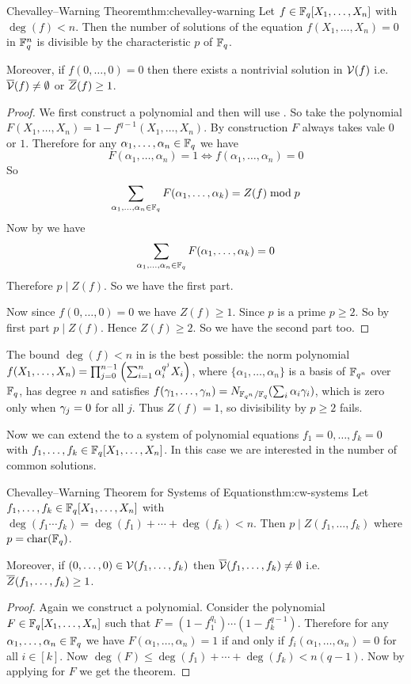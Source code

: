 \begin{Theorem}{Chevalley--Warning Theorem}{thm:chevalley-warning}
  Let $f\in\mathbb{F}_q[X_1,\dots,X_n]$ with $\deg(f)<n$. Then the number of solutions of the equation $f(X_1,\dots, X_n)=0$ in $\mathbb{F}_q^n$ is divisible by the characteristic $p$ of $\mathbb{F}_q$.

  Moreover, if $f(0,\dots, 0)=0$ then there exists a nontrivial solution in $\mathcal{V}(f)$ i.e. $\overline{\mathcal{V}}(f)\neq \emptyset$ or $\overline{Z}(f)\geq 1$.
\end{Theorem}
\begin{proof}
  We first construct a polynomial and then will use \PolyEvallem. So take the polynomial $F(X_1,\dots, X_n)=1-f^{q-1}(X_1,\dots, X_n)$. By construction $F$ always takes vale $0$ or $1$. Therefore for any $\alpha_1,\dots, \alpha_n\in\mathbb{F}_q$ we have $$F(\alpha_1,\dots,\alpha_n)=1\iff f(\alpha_1,\dots, \alpha_n)=0$$So $$\sum_{\alpha_1,\dots,\alpha_n\in\mathbb{F}_q}F(\alpha_1,\dots, \alpha_k)=Z(f)\bmod p$$Now by \PolyEvallem we have $$\sum_{\alpha_1,\dots,\alpha_n\in\mathbb{F}_q}F(\alpha_1,\dots, \alpha_k)=0$$Therefore $p\mid Z(f)$. So we have the first part. 

  Now since $f(0,\dots, 0)=0$ we have $Z(f)\geq 1$. Since $p$ is a prime $p\geq 2$. So by first part $p\mid Z(f)$. Hence $Z(f)\geq 2$. So we have the second part too. 
\end{proof}

\begin{note}
The bound $\deg(f)<n$ in \CWthm is the best possible: the norm polynomial $f(X_1,\dots, X_n)=\prod_{j=0}^{n-1}\left(\sum_{i=1}^n \alpha_i^{q^j}X_i\right)$, where $\{\alpha_1,\dots, \alpha_n\}$ is a basis of $\mathbb{F}_{q^n}$ over $\mathbb{F}_q$, has degree $n$ and satisfies $f(\gamma_1,\dots,\gamma_n)=N_{\mathbb{F}_{q^n}/\mathbb{F}_q}(\sum_i\alpha_i\gamma_i)$, which is zero only when $\gamma_j=0$ for all $j$. Thus $Z(f)=1$, so divisibility by $p\geq 2$ fails.
\end{note} 

Now we can extend the \CWthm to a system of polynomial equations $f_1=0,\dots,f_k=0$ with $f_1,\dots,f_k\in\mathbb{F}_q[X_1,\dots,X_n]$. In this case we are interested in the number of common solutions. 
\begin{Theorem}{Chevalley--Warning Theorem for Systems of Equations}{thm:cw-systems}
  Let $f_1,\dots, f_k\in\mathbb{F}_q[X_1,\dots, X_n]$ with $\deg(f_1\cdots f_k)=\deg(f_1)+\cdots+\deg(f_k)<n$. Then $p\mid Z(f_1,\dots, f_k)$ where $p=\operatorname{char}(\mathbb{F}_q)$. 

  Moreover, if $(0,\dots, 0)\in \mathcal{V}(f_1,\dots, f_k)$ then $\overline{\mathcal{V}}(f_1,\dots, f_k)\neq\emptyset$ i.e. $\overline{Z}(f_1,\dots, f_k)\geq 1$. 
\end{Theorem}
\begin{proof}
  Again we construct a polynomial. Consider the polynomial $F\in\mathbb{F}_q[X_1,\dots, X_n]$ such that $F=(1-f_1^{q_1})\cdots (1-f_k^{q-1})$. Therefore for any $\alpha_1,\dots,\alpha_n\in\mathbb{F}_q$ we have $F(\alpha_1,\dots,\alpha_n)=1$ if and only if $f_i(\alpha_1,\dots, \alpha_n)=0$ for all $i\in[k]$. Now $\deg(F)\leq \deg(f_1)+\cdots+\deg(f_k)<n(q-1)$. Now by applying \CWthm for $F$ we get the theorem. 
\end{proof}

